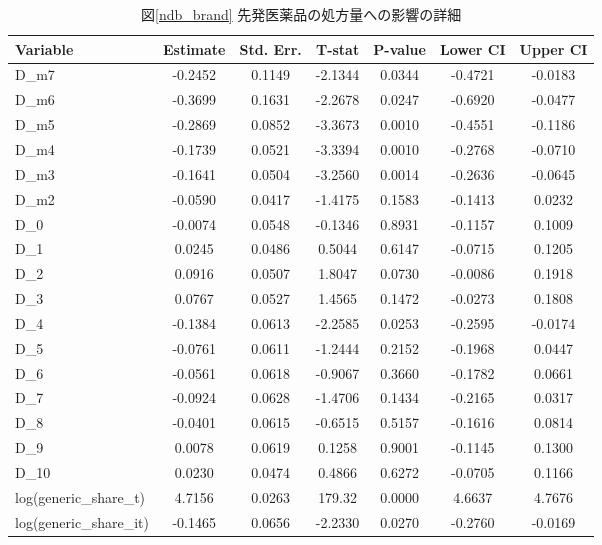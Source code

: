 \documentclass[a4paper,11pt,uplatex]{jsarticle}
\theoremstyle{definition}
\begin{document}
\begin{appendices}
    \begin{table}[ht]
    \small
    \centering  
    \caption{図\ref{ndb_brand} 先発医薬品の処方量への影響の詳細}
        \begin{tabular}{lcccccc}
            \hline
            \textbf{Variable} & \textbf{Estimate} & \textbf{Std. Err.} & \textbf{T-stat} & \textbf{P-value} & \textbf{Lower CI} & \textbf{Upper CI} \\
            \hline
            D\_m7 & -0.2452 & 0.1149 & -2.1344 & 0.0344 & -0.4721 & -0.0183 \\
            D\_m6 & -0.3699 & 0.1631 & -2.2678 & 0.0247 & -0.6920 & -0.0477 \\
            D\_m5 & -0.2869 & 0.0852 & -3.3673 & 0.0010 & -0.4551 & -0.1186 \\
            D\_m4 & -0.1739 & 0.0521 & -3.3394 & 0.0010 & -0.2768 & -0.0710 \\
            D\_m3 & -0.1641 & 0.0504 & -3.2560 & 0.0014 & -0.2636 & -0.0645 \\
            D\_m2 & -0.0590 & 0.0417 & -1.4175 & 0.1583 & -0.1413 &  0.0232 \\
            D\_0 & -0.0074 & 0.0548 & -0.1346 & 0.8931 & -0.1157 &  0.1009 \\
            D\_1 &  0.0245 & 0.0486 &  0.5044 & 0.6147 & -0.0715 &  0.1205 \\
            D\_2 &  0.0916 & 0.0507 &  1.8047 & 0.0730 & -0.0086 &  0.1918 \\
            D\_3 &  0.0767 & 0.0527 &  1.4565 & 0.1472 & -0.0273 &  0.1808 \\
            D\_4 & -0.1384 & 0.0613 & -2.2585 & 0.0253 & -0.2595 & -0.0174 \\
            D\_5 & -0.0761 & 0.0611 & -1.2444 & 0.2152 & -0.1968 &  0.0447 \\
            D\_6 & -0.0561 & 0.0618 & -0.9067 & 0.3660 & -0.1782 &  0.0661 \\
            D\_7 & -0.0924 & 0.0628 & -1.4706 & 0.1434 & -0.2165 &  0.0317 \\
            D\_8 & -0.0401 & 0.0615 & -0.6515 & 0.5157 & -0.1616 &  0.0814 \\
            D\_9 &  0.0078 & 0.0619 &  0.1258 & 0.9001 & -0.1145 &  0.1300 \\
            D\_10 & 0.0230 & 0.0474 & 0.4866 & 0.6272 & -0.0705 & 0.1166 \\
            log(generic\_share\_t) & 4.7156 & 0.0263 & 179.32 & 0.0000 & 4.6637 & 4.7676 \\
            log(generic\_share\_it) & -0.1465 & 0.0656 & -2.2330 & 0.0270 & -0.2760 & -0.0169 \\
            \hline
        \end{tabular}
        \label{tab:panelols_summary}
    \end{table}
    

\end{appendices}
\end{document}
